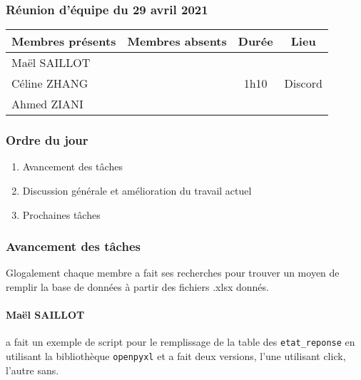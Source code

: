 


% 
\subsubsection*{\large{Réunion d'équipe du 29 avril 2021}}
\begin{center}
\begin{tabular}{| l | l || c | c |}
    \hline
    Membres présents & Membres absents & Durée & Lieu \\
    \hline
    Maël SAILLOT & & & \\ Céline ZHANG & & 1h10 & Discord \\ Ahmed ZIANI & & & \\
    \hline
\end{tabular}
\end{center}

\subsubsection*{Ordre du jour}
\begin{enumerate}
    \item Avancement des tâches
    \item Discussion générale et amélioration du travail actuel
    \item Prochaines tâches
\end{enumerate}

\subsubsection*{Avancement des tâches}
Glogalement chaque membre a fait ses recherches pour trouver un moyen de remplir la base de données à partir des fichiers \textsf{.xlsx} donnés.
\paragraph{Maël SAILLOT} a fait un exemple de script pour le remplissage de la table des \texttt{etat\_reponse} en utilisant la bibliothèque \texttt{openpyxl} et a fait deux versions, l'une utilisant \textsf{click}, l'autre sans.

